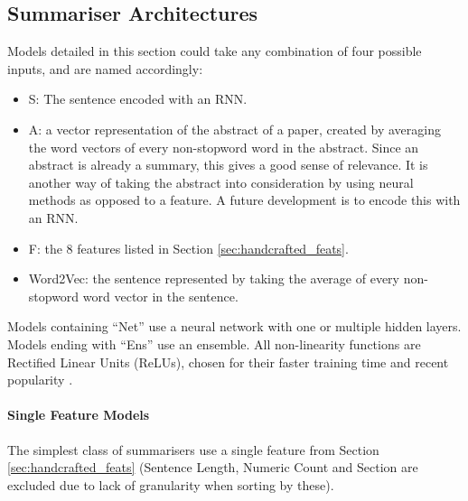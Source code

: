 \documentclass[11pt,a4paper]{article}
\begin{document}
\subsection{Summariser Architectures}
\label{sec:summ_architectures}
Models detailed in this section could take any combination of four possible inputs, and are named accordingly:
\begin{itemize}
\item{S: The sentence encoded with an RNN.}%
\item{A: a vector representation of the abstract of a paper, created by averaging the word vectors of every non-stopword word in the abstract. Since an abstract is already a summary, this gives a good sense of relevance. It is another way of taking the abstract into consideration by using neural methods as opposed to a feature. A future development is to encode this with an RNN.}%
\item{F: the 8 features listed in Section \ref{sec:handcrafted_feats}.}
\item{Word2Vec: the sentence represented by taking the average of every non-stopword word vector in the sentence.}
\end{itemize}
Models containing ``Net'' use a neural network with one or multiple hidden layers. Models ending with ``Ens'' use an ensemble. All non-linearity functions are Rectified Linear Units (ReLUs), chosen for their faster training time and recent popularity \cite{Krizhevsky2012}.

\paragraph{Single Feature Models}
The simplest class of summarisers use a single feature from Section \ref{sec:handcrafted_feats} (Sentence Length, Numeric Count and Section are excluded due to lack of granularity when sorting by these).%
\end{document}
